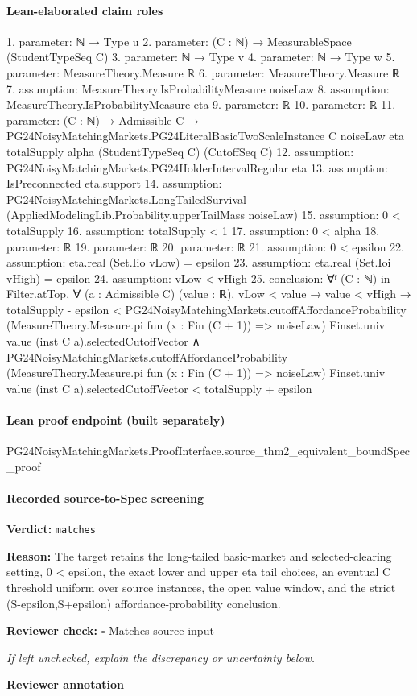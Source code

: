 \documentclass[10pt]{article}
\newcommand{\reviewerbox}{%
  \par\noindent\fbox{\parbox{0.96\linewidth}{\rule{0pt}{0.38in}}}\par
}
\newcommand{\reviewmatch}[1]{%
  \par\noindent\textbf{Reviewer check:} $\square$\; #1\par
  \noindent\emph{If left unchecked, explain the discrepancy or uncertainty below.}\par
}
\begin{document}
\paragraph{Lean-elaborated claim roles}\begin{ReviewVerbatim}
1. parameter: ℕ → Type u
2. parameter: (C : ℕ) → MeasurableSpace (StudentTypeSeq C)
3. parameter: ℕ → Type v
4. parameter: ℕ → Type w
5. parameter: MeasureTheory.Measure ℝ
6. parameter: MeasureTheory.Measure ℝ
7. assumption: MeasureTheory.IsProbabilityMeasure noiseLaw
8. assumption: MeasureTheory.IsProbabilityMeasure eta
9. parameter: ℝ
10. parameter: ℝ
11. parameter: (C : ℕ) →
  Admissible C →
    PG24NoisyMatchingMarkets.PG24LiteralBasicTwoScaleInstance C noiseLaw eta totalSupply alpha (StudentTypeSeq C)
      (CutoffSeq C)
12. assumption: PG24NoisyMatchingMarkets.PG24HolderIntervalRegular eta
13. assumption: IsPreconnected eta.support
14. assumption: PG24NoisyMatchingMarkets.LongTailedSurvival (AppliedModelingLib.Probability.upperTailMass noiseLaw)
15. assumption: 0 < totalSupply
16. assumption: totalSupply < 1
17. assumption: 0 < alpha
18. parameter: ℝ
19. parameter: ℝ
20. parameter: ℝ
21. assumption: 0 < epsilon
22. assumption: eta.real (Set.Iio vLow) = epsilon
23. assumption: eta.real (Set.Ioi vHigh) = epsilon
24. assumption: vLow < vHigh
25. conclusion: ∀ᶠ (C : ℕ) in Filter.atTop,
  ∀ (a : Admissible C) (value : ℝ),
    vLow < value →
      value < vHigh →
        totalSupply - epsilon <
            PG24NoisyMatchingMarkets.cutoffAffordanceProbability
              (MeasureTheory.Measure.pi fun (x : Fin (C + 1)) => noiseLaw) Finset.univ value
              (inst C a).selectedCutoffVector ∧
          PG24NoisyMatchingMarkets.cutoffAffordanceProbability
              (MeasureTheory.Measure.pi fun (x : Fin (C + 1)) => noiseLaw) Finset.univ value
              (inst C a).selectedCutoffVector <
            totalSupply + epsilon
\end{ReviewVerbatim}

\paragraph{Lean proof endpoint (built separately)}\begin{ReviewVerbatim}
PG24NoisyMatchingMarkets.ProofInterface.source_thm2_equivalent_boundSpec_proof
\end{ReviewVerbatim}

\paragraph{Recorded source-to-Spec screening}
\textbf{Verdict:} \texttt{matches}
\\
{\raggedright
\textbf{Reason:} The target retains the long-\allowbreak{}tailed basic-\allowbreak{}market and selected-\allowbreak{}clearing setting, 0 < epsilon, the exact lower and upper eta tail choices, an eventual C threshold uniform over source instances, the open value window, and the strict (S-\allowbreak{}epsilon,S+epsilon) affordance-\allowbreak{}probability conclusion.\allowbreak{}
\par}
\reviewmatch{Matches source input}
\noindent\textbf{Reviewer annotation}\par
\reviewerbox
\clearpage
\hypertarget{source-claim-ab8439dc4f2d61d9}{}
\end{document}
